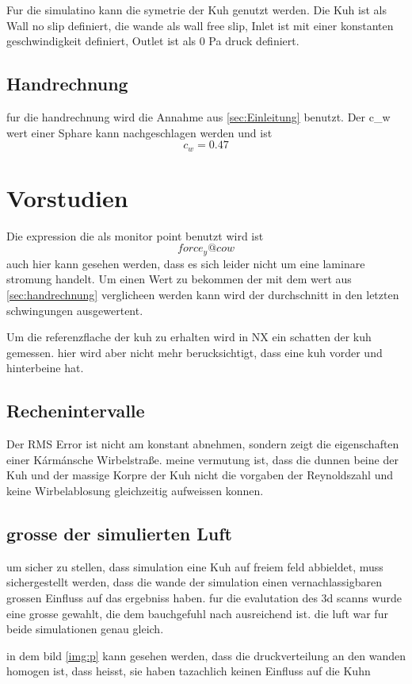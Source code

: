 \documentclass[a4paper,12pt]{article}
\begin{document}
Fur die simulatino kann die symetrie der Kuh genutzt werden. Die Kuh ist als Wall no slip definiert, die wande als wall free slip, Inlet ist mit einer konstanten geschwindigkeit definiert, Outlet ist als 0 Pa druck definiert. 

\subsection{Handrechnung}
fur die handrechnung wird die Annahme aus \ref{sec:Einleitung} benutzt. Der c_w wert einer Sphare kann nachgeschlagen werden und ist
$$c_w = 0.47$$
\cite{wiki}


\section{Vorstudien}

Die expression die als monitor point benutzt wird ist
$$ force_y@cow$$
auch hier kann gesehen werden, dass es sich leider nicht um eine laminare stromung handelt. Um einen Wert zu bekommen der mit dem wert aus \ref{sec:handrechnung} verglicheen werden kann wird der durchschnitt in den letzten schwingungen ausgewertent.

Um die referenzflache der kuh zu erhalten wird in NX ein schatten der kuh gemessen. hier wird aber nicht mehr berucksichtigt, dass eine kuh vorder und hinterbeine hat.

\subsection{Rechenintervalle}
Der RMS Error  ist nicht am konstant abnehmen, sondern zeigt die eigenschaften einer Kármánsche Wirbelstraße. meine vermutung ist, dass die dunnen beine der Kuh und der massige Korpre der Kuh nicht die vorgaben der Reynoldszahl und keine Wirbelablosung gleichzeitig aufweissen konnen. 

\subsection{grosse der simulierten Luft}
um sicher zu stellen, dass simulation eine Kuh auf freiem feld abbieldet, muss sichergestellt werden, dass die wande der simulation einen vernachlassigbaren grossen Einfluss auf das ergebniss haben. fur die evalutation des 3d scanns wurde eine grosse gewahlt, die dem bauchgefuhl nach ausreichend ist. die luft war fur beide simulationen genau gleich.

in dem bild \ref{img:p} kann gesehen werden, dass die druckverteilung an den wanden homogen ist, dass heisst, sie haben tazachlich keinen Einfluss auf die Kuhn
\end{document}
